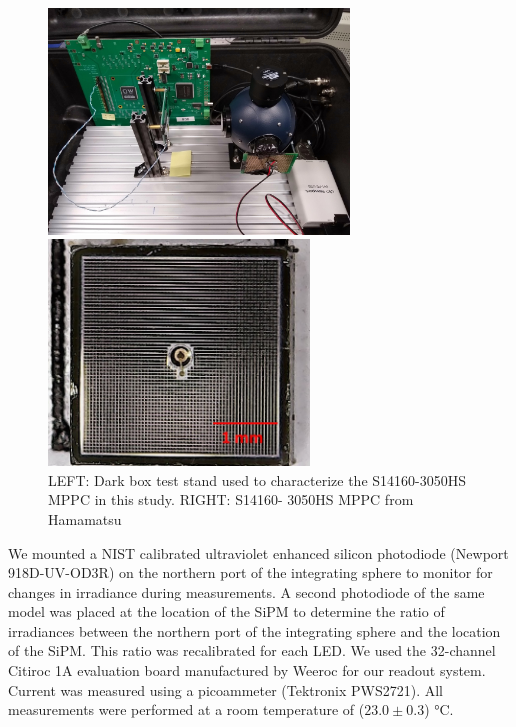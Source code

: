 \documentclass{article}
\begin{document}
\begin{figure}[ht]
    \centering
    \begin{minipage}[b]{0.49\textwidth}
    \centering
    \includegraphics[height=6cm]{images/figura1.jpg}
    \end{minipage}
    \hfill
    \begin{minipage}[b]{0.49\textwidth}
    \centering
    \includegraphics[height=6cm]{images/figura2.jpg}
    \end{minipage}

    \caption{LEFT: Dark box test stand used to characterize the S14160-3050HS MPPC in this study. RIGHT: S14160- 3050HS MPPC from Hamamatsu}
    
    \label{fig:DarkBoxTest}
\end{figure}

We mounted a NIST calibrated ultraviolet enhanced silicon photodiode (Newport 918D-UV-OD3R) on the northern port of the integrating sphere to monitor for changes in irradiance during measurements. A second photodiode of the same model was placed at the location of the SiPM to determine the ratio of irradiances between the northern port of the integrating sphere and the location of the SiPM. This ratio was recalibrated for each LED. We used the 32-channel Citiroc 1A evaluation board manufactured by Weeroc for our readout system. Current was measured using a picoammeter (Tektronix PWS2721). All measurements were performed at a room temperature of ($23.0 \pm 0.3$) °C.
\end{document}
